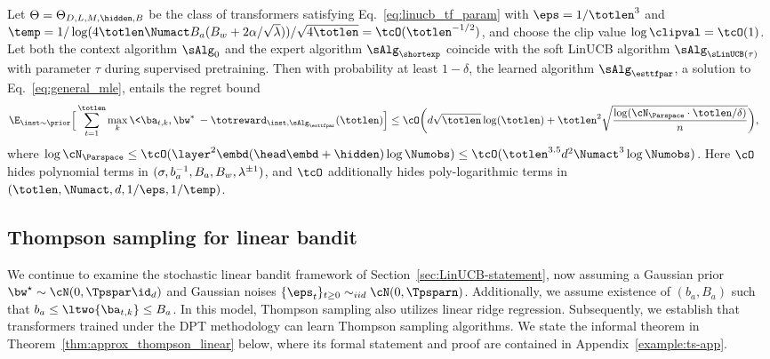 \documentclass[10pt]{article}
\begin{document}
\begin{theorem}\label{thm:smooth_linucb}
Let $\Theta = \Theta_{D, L, M, \hidden, B}$ be the class of transformers satisfying Eq.~\eqref{eq:linucb_tf_param} with $\eps=1/\totlen^3$ and $\temp = 1/ \log(4\totlen\Numact B_a(B_w+2\alpha/\sqrt{\lambda}))/\sqrt{4\totlen}=\tcO(\totlen^{-1/2})$, and choose the clip value $\log\clipval = \tcO(1)$. Let both the context algorithm $\sAlg_0$ and the expert algorithm $\sAlg_\shortexp$ coincide with the soft LinUCB algorithm $\sAlg_{\sLinUCB(\tau)}$ with parameter $\tau$ during supervised pretraining. Then with probability at least $1-\delta$, the learned algorithm $\sAlg_{\esttfpar}$, a solution to Eq.~\eqref{eq:general_mle}, entails the regret bound
\begin{align*}
\E_{\inst\sim\prior}\Big[\sum_{t=1}^\totlen\max_{k}\<\ba_{t,k},\bw^*\>-\totreward_{\inst,\sAlg_\esttfpar}(\totlen)\Big]&\leq   \cO\bigg( d\sqrt{\totlen}\log(\totlen)+ \totlen^2\sqrt{\frac{\log ( \cN_{\Parspace} \cdot \totlen/\delta )}{n} } \bigg),
\end{align*}
where $\log \cN_{\Parspace} \le \tcO(\layer^2\embd(\head\embd+\hidden) \log\Numobs) \leq \tcO(\totlen^{3.5} d^2 \Numact^3\log\Numobs)$. Here $\cO$ hides polynomial terms in $(\sigma, b_a^{-1}, B_a, \\B_w, \lambda^{\pm1})$, and $\tcO$ additionally hides poly-logarithmic terms in $(\totlen, \Numact, d, 1/\eps,1/\temp)$.
\end{theorem}



\subsection{Thompson sampling for linear bandit}\label{sec:TS-statement}


We continue to examine the stochastic linear bandit framework of Section~\ref{sec:LinUCB-statement}, now assuming a Gaussian prior $\bw^\star\sim \cN(0,\Tpspar\id_d)$ and Gaussian noises $\{ \eps_t \}_{t \ge 0} \sim_{iid} \cN(0,\Tpsparn)$. Additionally, we assume existence of $(b_a, B_a)$ such that $b_a\leq\ltwo{\ba_{t,k}}\leq B_a$. In this model, Thompson sampling also utilizes linear ridge regression. Subsequently, we establish that transformers trained under the DPT methodology can learn Thompson sampling algorithms. We state the informal theorem in Theorem~\ref{thm:approx_thompson_linear} below, where its formal statement and proof are contained in Appendix~\ref{example:ts-app}.
\end{document}
